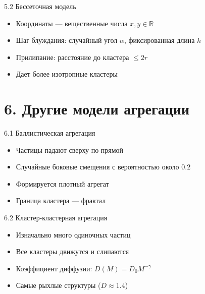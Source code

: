 \documentclass[
  ignorenonframetext,
  aspectratio=169,
  russian,
]{beamer}
\providecommand{\tightlist}{%
  \setlength{\itemsep}{0pt}\setlength{\parskip}{0pt}}
\begin{document}
\begin{frame}{5.2 Бессеточная модель}
\label{ux431ux435ux441ux441ux435ux442ux43eux447ux43dux430ux44f-ux43cux43eux434ux435ux43bux44c}
\begin{itemize}
\tightlist
\item
  Координаты --- вещественные числа \(x, y \in \mathbb{R}\)
\item
  Шаг блуждания: случайный угол \(\alpha\), фиксированная длина \(h\)
\item
  Прилипание: расстояние до кластера \(\le 2r\)
\item
  Дает более изотропные кластеры
\end{itemize}
\end{frame}

\section{6. Другие модели
агрегации}\label{ux434ux440ux443ux433ux438ux435-ux43cux43eux434ux435ux43bux438-ux430ux433ux440ux435ux433ux430ux446ux438ux438}

\begin{frame}{6.1 Баллистическая агрегация}
\label{ux431ux430ux43bux43bux438ux441ux442ux438ux447ux435ux441ux43aux430ux44f-ux430ux433ux440ux435ux433ux430ux446ux438ux44f}
\begin{itemize}
\tightlist
\item
  Частицы падают сверху по прямой
\item
  Случайные боковые смещения с вероятностью около \(0.2\)
\item
  Формируется плотный агрегат
\item
  Граница кластера --- фрактал
\end{itemize}
\end{frame}

\begin{frame}{6.2 Кластер-кластерная агрегация}
\label{ux43aux43bux430ux441ux442ux435ux440-ux43aux43bux430ux441ux442ux435ux440ux43dux430ux44f-ux430ux433ux440ux435ux433ux430ux446ux438ux44f}
\begin{itemize}
\tightlist
\item
  Изначально много одиночных частиц
\item
  Все кластеры движутся и слипаются
\item
  Коэффициент диффузии: \(D(M) = D_0 M^{-\gamma}\)
\item
  Самые рыхлые структуры (\(D \approx 1.4\))
\end{itemize}
\end{frame}
\end{document}
